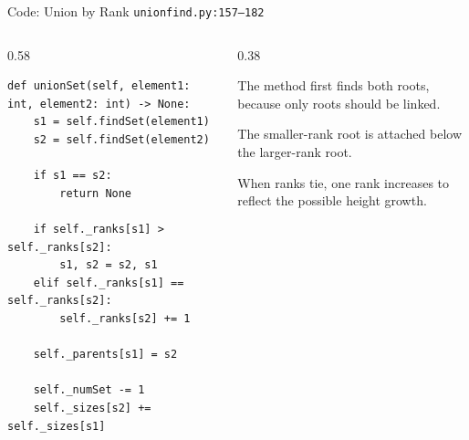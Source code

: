 \documentclass[aspectratio=169,11pt]{beamer}
\begin{document}
\begin{frame}[fragile]{Code: Union by Rank}
\scriptsize
{} \texttt{unionfind.py:157--182}

\vspace{0.08cm}
\begin{columns}[T,totalwidth=\textwidth]
\begin{column}{0.58\textwidth}
\begin{lstlisting}[style=cpcode]
def unionSet(self, element1: int, element2: int) -> None:
    s1 = self.findSet(element1)
    s2 = self.findSet(element2)

    if s1 == s2:
        return None

    if self._ranks[s1] > self._ranks[s2]:
        s1, s2 = s2, s1
    elif self._ranks[s1] == self._ranks[s2]:
        self._ranks[s2] += 1

    self._parents[s1] = s2

    self._numSet -= 1
    self._sizes[s2] += self._sizes[s1]
\end{lstlisting}
\end{column}
\begin{column}{0.38\textwidth}
\begin{tightitemize}
  \item The method first finds both roots, because only roots should be linked.
  \item The smaller-rank root is attached below the larger-rank root.
  \item When ranks tie, one rank increases to reflect the possible height growth.
\end{tightitemize}
\end{column}
\end{columns}
\end{frame}
\end{document}
